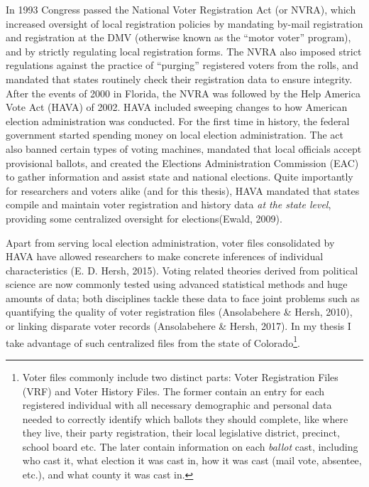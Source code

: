 \documentclass[12pt,twoside]{reedthesis}
\begin{document}
  In 1993 Congress passed the National Voter Registration Act (or NVRA),
  which increased oversight of local registration policies by mandating
  by-mail registration and registration at the DMV (otherwise known as the
  ``motor voter'' program), and by strictly regulating local registration
  forms. The NVRA also imposed strict regulations against the practice of
  ``purging'' registered voters from the rolls, and mandated that states
  routinely check their registration data to ensure integrity. After the
  events of 2000 in Florida, the NVRA was followed by the Help America
  Vote Act (HAVA) of 2002. HAVA included sweeping changes to how American
  election administration was conducted. For the first time in history,
  the federal government started spending money on local election
  administration. The act also banned certain types of voting machines,
  mandated that local officials accept provisional ballots, and created
  the Elections Administration Commission (EAC) to gather information and
  assist state and national elections. Quite importantly for researchers
  and voters alike (and for this thesis), HAVA mandated that states
  compile and maintain voter registration and history data \emph{at the
  state level}, providing some centralized oversight for elections(Ewald,
  2009).
  
  Apart from serving local election administration, voter files
  consolidated by HAVA have allowed researchers to make concrete
  inferences of individual characteristics (E. D. Hersh, 2015). Voting
  related theories derived from political science are now commonly tested
  using advanced statistical methods and huge amounts of data; both
  disciplines tackle these data to face joint problems such as quantifying
  the quality of voter registration files (Ansolabehere \& Hersh, 2010),
  or linking disparate voter records (Ansolabehere \& Hersh, 2017). In my
  thesis I take advantage of such centralized files from the state of
  Colorado\footnote{Voter files commonly include two distinct parts: Voter
    Registration Files (VRF) and Voter History Files. The former contain
    an entry for each registered individual with all necessary demographic
    and personal data needed to correctly identify which ballots they
    should complete, like where they live, their party registration, their
    local legislative district, precinct, school board etc. The later
    contain information on each \emph{ballot} cast, including who cast it,
    what election it was cast in, how it was cast (mail vote, absentee,
    etc.), and what county it was cast in.}.
  
\end{document}
